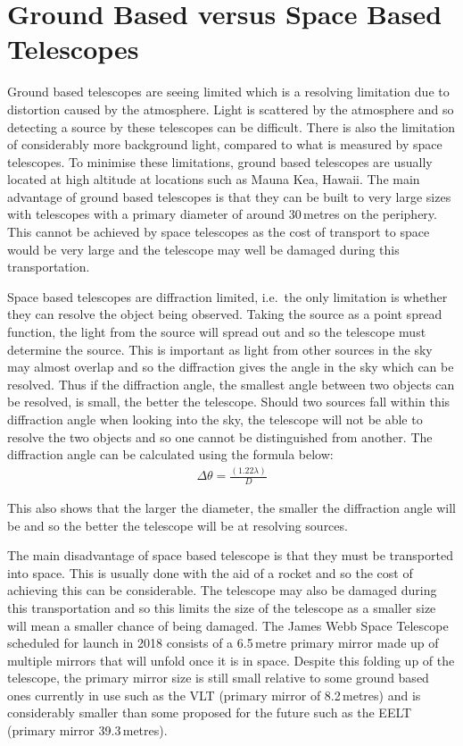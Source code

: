 \section{Ground Based versus Space Based Telescopes} %
\label{sec:ground_based_versus_space_based_telescopes}
	Ground based telescopes are seeing limited which is a resolving limitation due to distortion caused by the atmosphere. Light is scattered by the atmosphere and so detecting a source by these telescopes can be difficult. There is also the limitation of considerably more background light, compared to what is measured by space telescopes. To minimise these limitations, ground based telescopes are usually located at high altitude at locations such as Mauna Kea, Hawaii. The main advantage of ground based telescopes is that they can be built to very large sizes with telescopes with a primary diameter of around 30\,metres on the periphery. This cannot be achieved by space telescopes as the cost of transport to space would be very large and the telescope may well be damaged during this transportation.

	Space based telescopes are diffraction limited, i.e.\ the only limitation is whether they can resolve the object being observed. Taking the source as a point spread function, the light from the source will spread out and so the telescope must determine the source. This is important as light from other sources in the sky may almost overlap and so the diffraction gives the angle in the sky which can be resolved. Thus if the diffraction angle, the smallest angle between two objects can be resolved, is small, the better the telescope. Should two sources fall within this diffraction angle when looking into the sky, the telescope will not be able to resolve the two objects and so one cannot be distinguished from another. The diffraction angle can be calculated using the formula below:
	\begin{align}
		\Delta\theta= \frac{(1.22 \lambda)}D
	\end{align}

	This also shows that the larger the diameter, the smaller the diffraction angle will be and so the better the telescope will be at resolving sources.

	The main disadvantage of space based telescope is that they must be transported into space. This is usually done with the aid of a rocket and so the cost of achieving this can be considerable. The telescope may also be damaged during this transportation and so this limits the size of the telescope as a smaller size will mean a smaller chance of being damaged. The James Webb Space Telescope scheduled for launch in 2018 consists of a 6.5\,metre primary mirror made up of multiple mirrors that will unfold once it is in space. Despite this folding up of the telescope, the primary mirror size is still small relative to some ground based ones currently in use such as the VLT (primary mirror of 8.2\,metres) and is considerably smaller than some proposed for the future such as the EELT (primary mirror 39.3\,metres).


